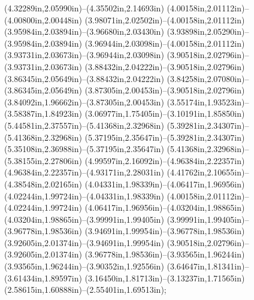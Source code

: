 (4.32289in,2.05990in)--(4.35502in,2.14693in) (4.00158in,2.01112in)--(4.00800in,2.00448in) (3.98071in,2.02502in)--(4.00158in,2.01112in) (3.95984in,2.03894in)--(3.96680in,2.03430in) (3.93898in,2.05290in)--(3.95984in,2.03894in) (3.96944in,2.03098in)--(4.00158in,2.01112in) (3.93731in,2.03673in)--(3.96944in,2.03098in) (3.90518in,2.02796in)--(3.93731in,2.03673in) (3.88432in,2.04222in)--(3.90518in,2.02796in) (3.86345in,2.05649in)--(3.88432in,2.04222in) (3.84258in,2.07080in)--(3.86345in,2.05649in) (3.87305in,2.00453in)--(3.90518in,2.02796in) (3.84092in,1.96662in)--(3.87305in,2.00453in) (3.55174in,1.93523in)--(3.58387in,1.84923in) (3.06977in,1.75405in)--(3.10191in,1.85850in) (5.44581in,2.37557in)--(5.41368in,2.32968in) (5.39281in,2.34307in)--(5.41368in,2.32968in) (5.37195in,2.35647in)--(5.39281in,2.34307in) (5.35108in,2.36988in)--(5.37195in,2.35647in) (5.41368in,2.32968in)--(5.38155in,2.27806in) (4.99597in,2.16092in)--(4.96384in,2.22357in) (4.96384in,2.22357in)--(4.93171in,2.28031in) (4.41762in,2.10655in)--(4.38548in,2.02165in) (4.04331in,1.98339in)--(4.06417in,1.96956in) (4.02244in,1.99724in)--(4.04331in,1.98339in) (4.00158in,2.01112in)--(4.02244in,1.99724in) (4.06417in,1.96956in)--(4.03204in,1.98865in) (4.03204in,1.98865in)--(3.99991in,1.99405in) (3.99991in,1.99405in)--(3.96778in,1.98536in) (3.94691in,1.99954in)--(3.96778in,1.98536in) (3.92605in,2.01374in)--(3.94691in,1.99954in) (3.90518in,2.02796in)--(3.92605in,2.01374in) (3.96778in,1.98536in)--(3.93565in,1.96244in) (3.93565in,1.96244in)--(3.90352in,1.92556in) (3.64647in,1.81341in)--(3.61434in,1.89597in) (3.16450in,1.81713in)--(3.13237in,1.71565in) (2.58615in,1.60888in)--(2.55401in,1.69513in);
